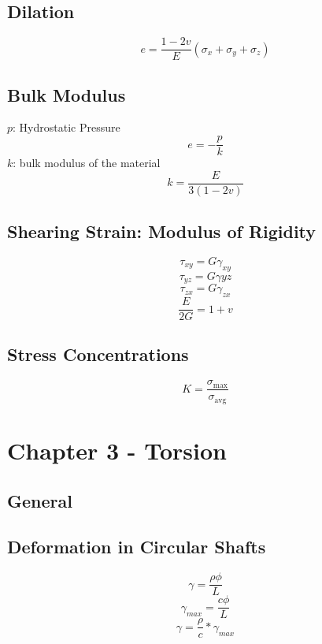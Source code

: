 \documentclass[10pt,landscape]{article}
\begin{document}
\begin{multicols}{3}
\subsection{Dilation}
\begin{equation}
    e=\frac{1-2v}{E}(\sigma_x+\sigma_y+\sigma_z)
\end{equation}
\subsection{Bulk Modulus}
$p$: Hydrostatic Pressure
\begin{equation}
    e=-\frac{p}{k}
\end{equation}
$k$: bulk modulus of the material
\begin{equation}
    k=\frac{E}{3(1-2v)}
\end{equation}
\subsection{Shearing Strain: Modulus of Rigidity}
\begin{equation}
    \tau_{xy}=G\gamma_{xy}
\end{equation}
\begin{equation}
    \tau_{yz}=G\gamma{yz}
\end{equation}
\begin{equation}
    \tau_{zx}=G\gamma_{zx}
\end{equation}
\begin{equation}
    \frac{E}{2G}=1+v
\end{equation}
\subsection{Stress Concentrations}
\begin{equation}
    K=\frac{\sigma_\text{max}}{\sigma_\text{avg}}
\end{equation}

\section{Chapter 3 - Torsion}
\subsection{General}
\subsection{Deformation in Circular Shafts}
\begin{equation}
    \gamma=\frac{\rho\phi}{L}
\end{equation}
\begin{equation}
    \gamma_{max}=\frac{c\phi}{L}
\end{equation}
\begin{equation}
    \gamma=\frac{\rho}{c}*\gamma_{max}
\end{equation}

\end{multicols}
\end{document}
